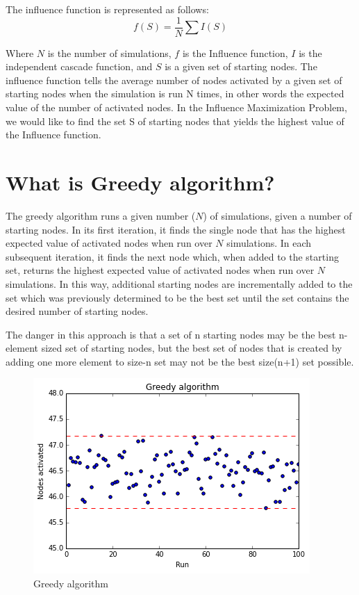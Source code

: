 \documentclass[11pt]{scrartcl} %
\begin{document}
The influence function is represented as follows:
\begin{equation}
f(S) = \frac{1}{N} \sum I(S)
\end{equation}

Where $N$ is the number of simulations, $f$ is the Influence function, $I$ is the independent cascade function, and $S$ is a given set of starting nodes.  The influence function tells the average number of nodes activated by a given set of starting nodes when the simulation is run N times, in other words the expected value of the number of activated nodes.  In the Influence Maximization Problem, we would like to find the set S of starting nodes that yields the highest value of the Influence function.    


\section{What is Greedy algorithm?}

The greedy algorithm runs a given number ($N$) of simulations, given a number of starting nodes.  In its first iteration, it finds the single node that has the highest expected value of activated nodes when run over $N$ simulations.  In each subsequent iteration, it finds the next node which, when added to the starting set, returns the highest expected value of activated nodes when run over $N$ simulations.  In this way, additional starting nodes are incrementally added to the set which was previously determined to be the best set until the set contains the desired number of starting nodes.  
	
The danger in this approach is that a set of n starting nodes may be the best n-element sized set of starting nodes, but the best set of nodes that is created by adding one more element to size-n set may not be the best size(n+1) set possible.  

\begin{figure}[h!]
\centering
\includegraphics[width=10 cm]{Greedy}
\caption{Greedy algorithm}
\label{fig:GA}
\end{figure}
\end{document}

